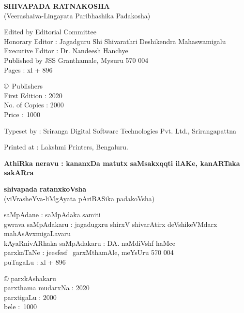 \thispagestyle{empty}
\noindent
{\rm\sf\bfseries SHIVAPADA RATNAKOSHA}\\[5pt]
{\rm (Veerashaiva-Lingayata Paribhashika Padakosha)} 

\noindent
{\rm Edited by Editorial Committee}\\
{\rm Honorary Editor : Jagadguru Shi Shivarathri Deshikendra Mahaswamigalu}\\
{\rm Executive Editor : Dr. Nandeesh Hanchye}\\
{\rm Published by JSS Granthamale, Mysuru 570 004}\\[8pt]
{\rm Pages : xl + 896}

\vspace{1cm}

\noindent
{\rm \copyright \ Publishers}\\[7pt]
{\rm First Edition : 2020}\\[7pt]
{\rm No. of Copies : 2000}\\[7pt]
{\rm Price : \rupee\,1000}

\bigskip

\noindent
{\rm Typeset by : Sriranga Digital Software Technologies Pvt. Ltd., Srirangapattna}

\medskip

\noindent
{\rm Printed at : Lakshmi Printers, Bengaluru.}

\vfill

\noindent
{\bf AthiRka neravu : kananxDa matutx saMsakxqqti ilAKe, kanARTaka sakARra}

\vskip 1cm

\noindent
{\bf\large shivapada ratanxkoVsha}\\[5pt]
(viVrasheYva-liMgAyata pAriBASika padakoVsha) 

\smallskip

\noindent
saMpAdane : saMpAdaka samiti\\
gwrava saMpAdakaru : jagadugxru shirxV shivarAtirx deVshikeVMdarx mahAsAvxmigaLavaru\\
kAyaRnivARhaka saMpAdakaru : DA. naMdiVshf haMce\\
parxkaTaNe : je{esf}{esf} \ garxMthamAle, meYsUru 570 004\\[8pt]
puTagaLu : {\rm xl} + 896

\vspace{1cm}

\noindent
{\rm \copyright} parxkAshakaru\\[7pt]
parxthama mudarxNa : 2020\\[7pt]
parxtigaLu : 2000\\[10pt]
bele : \rupee\,1000

